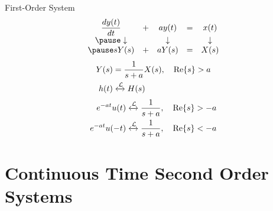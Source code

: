 \begin{frame}{First-Order System}
    \begin{equation*}
        \begin{matrix}
            \dfrac{dy(t)}{dt} & +& ay(t) &= &x(t)\\
            \pause
            \downarrow &&\downarrow &&\downarrow\\
            \pause
            sY(s) & +& aY(s) &= &X(s)\\
        \end{matrix}
    \end{equation*}
    \pause
{}
{
    \begin{align*}
        Y(s) &= \dfrac{1}{s+a}X(s), \quad \mathrm{Re}\{s\}>a\\
        h(t) &\xleftrightarrow{\mathcal{L}} H(s)
    \end{align*}
    \pause
    \begin{align*}
        e^{-at}u(t) &\xleftrightarrow{\mathcal{L}} \dfrac{1}{s+a}, \quad \mathrm{Re}\{s\}>-a\\
        e^{-at}u(-t) &\xleftrightarrow{\mathcal{L}} \dfrac{1}{s+a}, \quad \mathrm{Re}\{s\}<-a
    \end{align*}
}
\end{frame}

\section{Continuous Time Second Order Systems}

